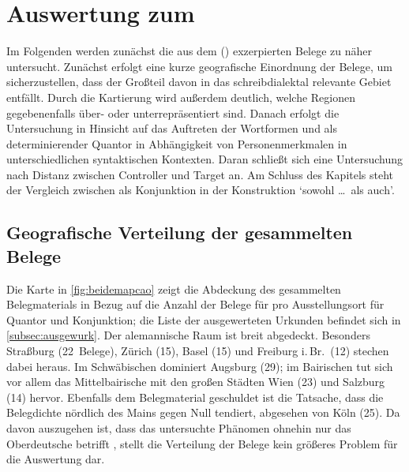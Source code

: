 \chapter{Auswertung zum }
\label{ch:caoanalyse}

Im Folgenden werden zunächst die aus dem  (\CAO) exzerpierten Belege zu  näher
untersucht. Zunächst erfolgt eine kurze geografische Einordnung der Belege, um
sicherzustellen, dass der Großteil davon in das schreib\-dialektal relevante
Gebiet entfällt. Durch die Kartierung wird außerdem deutlich, welche Regionen
gegebenenfalls über- oder unter\-repräsentiert sind. Danach erfolgt die
Untersuchung in Hinsicht auf das Auftreten der Wortformen  und
 als determinierender Quantor in Abhängigkeit von
Personenmerkmalen in unterschiedlichen syntaktischen Kontexten. Daran schließt
sich eine Untersuchung nach Distanz zwischen Controller und Target an. Am
Schluss des Kapitels steht der Vergleich zwischen  als
Konjunk\-tion in der Konstruktion  `sowohl \dots\ als
auch'.

\section{Geografische Verteilung der gesammelten Belege}

Die Karte in \cref{fig:beidemapcao} zeigt die Abdeckung des gesammelten
Belegmaterials in Bezug auf die Anzahl der Belege für  pro
Ausstellungsort für Quantor und Konjunktion; die Liste der ausgewerteten
Urkunden befindet sich in \cref{subsec:ausgewurk}. Der alemannische Raum ist
breit abgedeckt. Besonders Straßburg (22~Belege), Zürich (15), Basel (15) und
Freiburg i.\,Br.\ (12) stechen dabei heraus. Im Schwäbischen dominiert Augsburg
(29); im Bairischen tut sich vor allem das Mittelbairische mit den großen
Städten Wien (23) und Salzburg (14) hervor. Ebenfalls dem Belegmaterial
geschuldet ist die Tatsache, dass die Belegdichte nördlich des Mains gegen Null
tendiert, abgesehen von Köln (25). Da davon auszugehen ist, dass das
untersuchte Phänomen ohnehin nur das Oberdeutsche betrifft
\autocite[181--184]{ksw2}, stellt die Verteilung der Belege kein größeres
Problem für die Auswertung dar.


